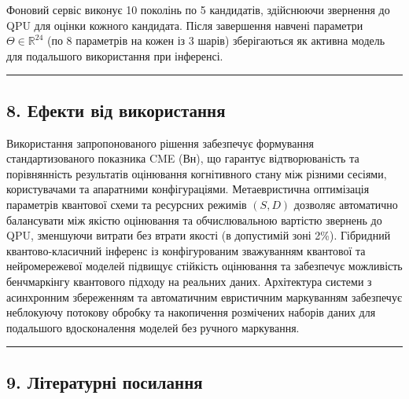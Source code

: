 \documentclass[12pt,a4paper]{article}
\begin{document}
Фоновий сервіс виконує 10 поколінь по 5 кандидатів, здійснюючи звернення до QPU для оцінки кожного кандидата. Після завершення навчені параметри \(\Theta \in \mathbb{R}^{24}\) (по 8 параметрів на кожен із 3 шарів) зберігаються як активна модель для подальшого використання при інференсі.



\begin{center}\rule{0.5\linewidth}{0.5pt}\end{center}



\subsection{8. Ефекти від використання}\label{ux435ux444ux435ux43aux442ux438-ux432ux456ux434-ux432ux438ux43aux43eux440ux438ux441ux442ux430ux43dux43dux44f}



Використання запропонованого рішення забезпечує формування стандартизованого показника CME (Вн), що гарантує відтворюваність та порівнянність результатів оцінювання когнітивного стану між різними сесіями, користувачами та апаратними конфігураціями. Метаевристична оптимізація параметрів квантової схеми та ресурсних режимів \((S, D)\) дозволяє автоматично балансувати між якістю оцінювання та обчислювальною вартістю звернень до QPU, зменшуючи витрати без втрати якості (в допустимій зоні 2\%). Гібридний квантово-класичний інференс із конфігурованим зважуванням квантової та нейромережевої моделей підвищує стійкість оцінювання та забезпечує можливість бенчмаркінгу квантового підходу на реальних даних. Архітектура системи з асинхронним збереженням та автоматичним евристичним маркуванням забезпечує неблокуючу потокову обробку та накопичення розмічених наборів даних для подальшого вдосконалення моделей без ручного маркування.



\begin{center}\rule{0.5\linewidth}{0.5pt}\end{center}



\subsection{9. Літературні посилання}\label{ux43bux456ux442ux435ux440ux430ux442ux443ux440ux43dux456-ux43fux43eux441ux438ux43bux430ux43dux43dux44f}
\end{document}
